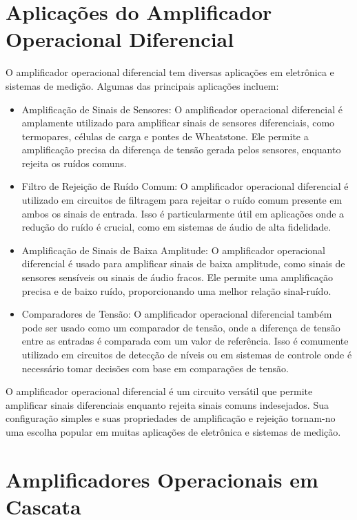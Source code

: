 \documentclass[12pt,twoside, a4paper, twocolumn]{article}
\begin{document}
\section{Aplicações do Amplificador Operacional Diferencial}


O amplificador operacional diferencial tem diversas aplicações em eletrônica e sistemas de medição. Algumas das principais aplicações incluem:


\begin{itemize}
    \item Amplificação de Sinais de Sensores: O amplificador operacional diferencial é amplamente utilizado para amplificar sinais de sensores diferenciais, como termopares, células de carga e pontes de Wheatstone. Ele permite a amplificação precisa da diferença de tensão gerada pelos sensores, enquanto rejeita os ruídos comuns.
    \item Filtro de Rejeição de Ruído Comum: O amplificador operacional diferencial é utilizado em circuitos de filtragem para rejeitar o ruído comum presente em ambos os sinais de entrada. Isso é particularmente útil em aplicações onde a redução do ruído é crucial, como em sistemas de áudio de alta fidelidade.
    \item Amplificação de Sinais de Baixa Amplitude: O amplificador operacional diferencial é usado para amplificar sinais de baixa amplitude, como sinais de sensores sensíveis ou sinais de áudio fracos. Ele permite uma amplificação precisa e de baixo ruído, proporcionando uma melhor relação sinal-ruído.
    \item Comparadores de Tensão: O amplificador operacional diferencial também pode ser usado como um comparador de tensão, onde a diferença de tensão entre as entradas é comparada com um valor de referência. Isso é comumente utilizado em circuitos de detecção de níveis ou em sistemas de controle onde é necessário tomar decisões com base em comparações de tensão.
\end{itemize}


O amplificador operacional diferencial é um circuito versátil que permite amplificar sinais diferenciais enquanto rejeita sinais comuns indesejados. Sua configuração simples e suas propriedades de amplificação e rejeição tornam-no uma escolha popular em muitas aplicações de eletrônica e sistemas de medição.


\newpage


\section{Amplificadores Operacionais em Cascata}
\end{document}
